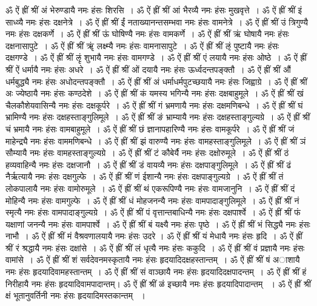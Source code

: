 ॐ ऐं ह्रीं श्रीं अं भेरुण्डायै नमः हंसः शिरसि~। 
ॐ ऐं ह्रीं श्रीं आं भैरव्यै नमः हंसः मुखवृत्ते~। 
ॐ ऐं ह्रीं श्रीं इं साध्व्यै नमः हंसः दक्षनेत्रे~। 
ॐ ऐं ह्रीं श्रीं ईं नताख्यानन्तसम्भवा नमः हंसः वामनेत्रे~। 
ॐ ऐं ह्रीं श्रीं उं त्रिगुण्यै नमः हंसः दक्षकर्णे~। 
ॐ ऐं ह्रीं श्रीं ऊं घोषिण्यै नमः हंसः वामकर्णे~। 
ॐ ऐं ह्रीं श्रीं ऋं घोषायै नमः हंसः दक्षनासापुटे~। 
ॐ ऐं ह्रीं श्रीं ॠं लक्ष्म्यै नमः हंसः वामनासापुटे~। 
ॐ ऐं ह्रीं श्रीं ऌं पुष्टायै नमः हंसः दक्षगण्डे~। 
ॐ ऐं ह्रीं श्रीं ऌृं शुभायै नमः हंसः वामगण्डे~। 
ॐ ऐं ह्रीं श्रीं एं लयायै नमः हंसः ओष्ठे~। 
ॐ ऐं ह्रीं श्रीं ऐं धर्मायै नमः हंसः अधरे~। 
ॐ ऐं ह्रीं श्रीं ओं दयायै नमः हंसः ऊर्ध्वदन्तपङ्क्तौ~। 
ॐ ऐं ह्रीं श्रीं औं धर्मबुद्ध्यै नमः हंसः अधोदन्तपङ्क्तौ~। 
ॐ ऐं ह्रीं श्रीं अं धर्माधर्मपुटच्छयायै नमः हंसः जिह्वाग्रे~। 
ॐ ऐं ह्रीं श्रीं अः ज्येष्ठायै नमः हंसः कण्ठदेशे~। 
ॐ ऐं ह्रीं श्रीं कं यमस्य भगिन्यै नमः हंसः दक्षबाहुमूले~। 
ॐ ऐं ह्रीं श्रीं खं चैलकौशेयवासिन्यै नमः हंसः दक्षकूर्परे~। 
ॐ ऐं ह्रीं श्रीं गं भ्रमणायै नमः हंसः दक्षमणिबन्धे~। 
ॐ ऐं ह्रीं श्रीं घं भ्रामिण्यै नमः हंसः दक्षहस्ताङ्गुलिमूले~। 
ॐ ऐं ह्रीं श्रीं ङं भ्राम्यायै नमः हंसः दक्षहस्ताङ्गुल्यग्रे~। 
ॐ ऐं ह्रीं श्रीं चं भ्रमायै नमः हंसः वामबाहुमूले~। 
ॐ ऐं ह्रीं श्रीं छं ज्ञानापहारिण्यै नमः हंसः वामकूर्परे~। 
ॐ ऐं ह्रीं श्रीं जं माहेन्द्र्यै नमः हंसः वाममणिबन्धे~। 
ॐ ऐं ह्रीं श्रीं झं वारुण्यै नमः हंसः वामहस्ताङ्गुलिमूले~। 
ॐ ऐं ह्रीं श्रीं ञं सौम्यायै नमः हंसः वामहस्ताङ्गुल्यग्रे~। 
ॐ ऐं ह्रीं श्रीं टं कौबेर्यै नमः हंसः दक्षोरुमूले~। 
ॐ ऐं ह्रीं श्रीं ठं हव्यवाहिन्यै नमः हंसः दक्षजानौ~। 
ॐ ऐं ह्रीं श्रीं डं वायव्यै नमः हंसः दक्षपाङ्गुलिमूले~। 
ॐ ऐं ह्रीं श्रीं ढं नैर्ऋत्यायै नमः हंसः दक्षगुल्फे~। 
ॐ ऐं ह्रीं श्रीं णं ईशान्यै नमः हंसः दक्षपाङ्गुल्यग्रे~। 
ॐ ऐं ह्रीं श्रीं तं लोकपालायै नमः हंसः वामोरुमूले~।
ॐ ऐं ह्रीं श्रीं थं एकरूपिण्यै नमः हंसः वामजानुनि~। 
ॐ ऐं ह्रीं श्रीं दं मोहिन्यै नमः हंसः वामगुल्फे~। 
ॐ ऐं ह्रीं श्रीं धं मोहजनन्यै नमः हंसः वामपादाङ्गुलिमूले~। 
ॐ ऐं ह्रीं श्रीं नं स्मृत्यै नमः हंसः वामपादाङ्गुल्यग्रे~। 
ॐ ऐं ह्रीं श्रीं पं वृत्तान्तबाधिन्यै नमः हंसः दक्षपार्श्वे~। 
ॐ ऐं ह्रीं श्रीं फं यक्षाणां जनन्यै नमः हंसः वामपार्श्वे~।
ॐ ऐं ह्रीं श्रीं बं यक्ष्यै नमः हंसः पृष्ठे~।
ॐ ऐं ह्रीं श्रीं भं सिद्ध्यै नमः हंसः नाभौ~। 
ॐ ऐं ह्रीं श्रीं मं वैश्रवणालयायै नमः हंसः उदरे ।
ॐ ऐं ह्रीं श्रीं यं मेधायै नमः हंसः हृदि~। 
ॐ ऐं ह्रीं श्रीं रं श्रद्धायै नमः हंसः दक्षांसे~। 
ॐ ऐं ह्रीं श्रीं लं धृत्यै नमः हंसः ककुदि~। 
ॐ ऐं ह्रीं श्रीं वं प्रज्ञायै नमः हंसः वामांसे~। 
ॐ ऐं ह्रीं श्रीं शं सर्वदेवनमस्कृतायै नमः हंसः हृदयादिदक्षहस्तान्तम्~।
ॐ ऐं ह्रीं श्रीं षं अाशायै नमः हंसः हृदयादिवामहस्तान्तम्~। 
ॐ ऐं ह्रीं श्रीं सं वाञ्छायै नमः हंसः हृदयादिदक्षपादन्तम्~। 
ॐ ऐं ह्रीं श्रीं हं निरीहायै नमः हंसः हृदयादिवामपादान्तम्। 
ॐ ऐं ह्रीं श्रीं ळं इच्छायै नमः हंसः हृदयादिपादान्तम् ~। 
ॐ ऐं ह्रीं श्रीं क्षं भूतानुवर्तिनी नमः हंसः हृदयादिमस्तकान्तम् ~।

